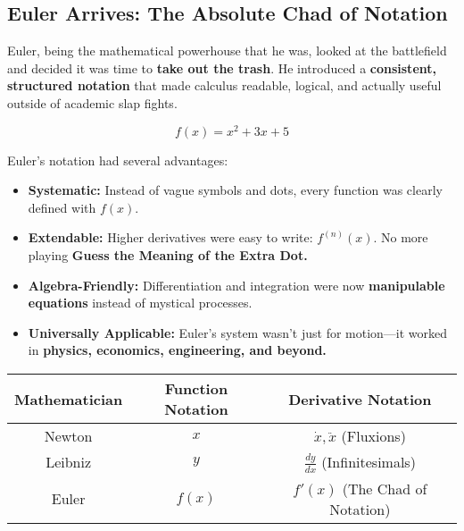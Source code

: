 \subsection{Euler Arrives: The Absolute Chad of Notation}  

Euler, being the mathematical powerhouse that he was, looked at the battlefield and decided it was time to \textbf{take out the trash}. He introduced a \textbf{consistent, structured notation} that made calculus readable, logical, and actually useful outside of academic slap fights.

\[
f(x) = x^2 + 3x + 5
\]

Euler’s notation had several advantages:

\begin{itemize}
    \item \textbf{Systematic:} Instead of vague symbols and dots, every function was clearly defined with \( f(x) \).  
    \item \textbf{Extendable:} Higher derivatives were easy to write: \( f^{(n)}(x) \). No more playing \textbf{Guess the Meaning of the Extra Dot.}  
    \item \textbf{Algebra-Friendly:} Differentiation and integration were now \textbf{manipulable equations} instead of mystical processes.  
    \item \textbf{Universally Applicable:} Euler’s system wasn’t just for motion—it worked in \textbf{physics, economics, engineering, and beyond.}  
\end{itemize}

\begin{center}
\renewcommand{\arraystretch}{1.5}
\begin{tabular}{|c|c|c|}
\hline
\textbf{Mathematician} & \textbf{Function Notation} & \textbf{Derivative Notation} \\ \hline
Newton & $x$ & $\dot{x}, \ddot{x}$ (Fluxions) \\ \hline
Leibniz & $y$ & $\frac{dy}{dx}$ (Infinitesimals) \\ \hline
Euler & $f(x)$ & $f'(x)$ (The Chad of Notation) \\ \hline
\end{tabular}
\end{center}
